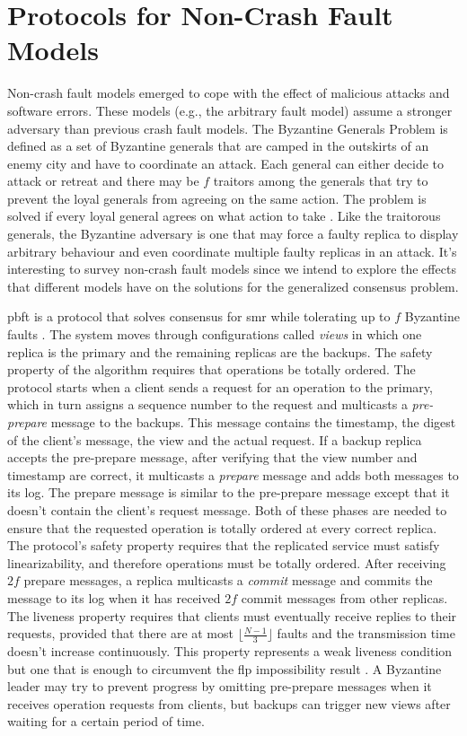 \section{Protocols for Non-Crash Fault Models} \label{Non-Crash}
Non-crash fault models emerged to cope with the effect of malicious attacks and software errors. These models (e.g., the arbitrary fault model) assume a stronger adversary than previous crash fault models. The Byzantine Generals Problem is defined as a set of Byzantine generals that are camped in the outskirts of an enemy city and have to coordinate an attack. Each general can either decide to attack or retreat and there may be $f$ traitors among the generals that try to prevent the loyal generals from agreeing on the same action. The problem is solved if every loyal general agrees on what action to take \cite{Lamport1982}. Like the traitorous generals, the Byzantine adversary is one that may force a faulty replica to display arbitrary behaviour and even coordinate multiple faulty replicas in an attack. It's interesting to survey non-crash fault models since we intend to explore the effects that different models have on the solutions for the generalized consensus problem. \par
\acrfull{pbft} is a protocol that solves consensus for \acrshort{smr} while tolerating up to $f$ Byzantine faults \cite{Castro1999}. The system moves through configurations called \textit{views} in which one replica is the primary and the remaining replicas are the backups. The safety property of the algorithm requires that operations be totally ordered. The protocol starts when a client sends a request for an operation to the primary, which in turn assigns a sequence number to the request and multicasts a \textit{pre-prepare} message to the backups. This message contains the timestamp, the digest of the client's message, the view and the actual request. If a backup replica accepts the pre-prepare message, after verifying that the view number and timestamp are correct, it multicasts a \textit{prepare} message and adds both messages to its log. The prepare message is similar to the pre-prepare message except that it doesn't contain the client's request message. Both of these phases are needed to ensure that the requested operation is totally ordered at every correct replica. The protocol's safety property requires that the replicated service must satisfy linearizability, and therefore operations must be totally ordered. After receiving $2f$ prepare messages, a replica multicasts a \textit{commit} message and commits the message to its log when it has received $2f$ commit messages from other replicas. The liveness property requires that clients must eventually receive replies to their requests, provided that there are at most $\lfloor\frac{N-1}{3}\rfloor$ faults and the transmission time doesn't increase continuously. This property represents a weak liveness condition but one that is enough to circumvent the \acrshort{flp} impossibility result \cite{Fischer1985}. A Byzantine leader may try to prevent progress by omitting pre-prepare messages when it receives operation requests from clients, but backups can trigger new views after waiting for a certain period of time. \par
